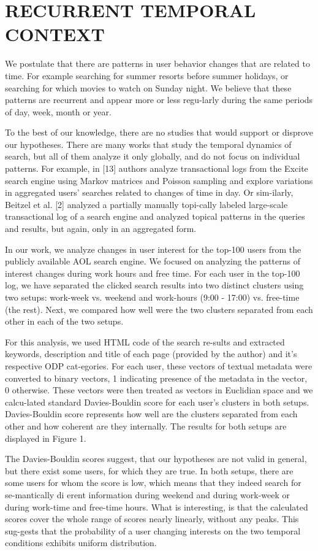 \documentclass{acm_proc_article-sp} %
\begin{document}
{\section{RECURRENT TEMPORAL CONTEXT}
We postulate that there are patterns in user behavior changes that are related to time. For example searching for summer resorts before summer holidays, or searching for which movies to watch on Sunday night. We believe that these patterns are recurrent and appear more or less regu-larly during the same periods of day, week, month or year.

To the best of our knowledge, there are no studies that would support or disprove our hypotheses. There are many works that study the temporal dynamics of search, but all of them analyze it only globally, and do not focus on individual patterns. For example, in [13] authors analyze transactional logs from the Excite search engine using Markov matrices and Poisson sampling and explore variations in aggregated users' searches related to changes of time in day. Or sim-ilarly, Beitzel et al. [2] analyzed a partially manually topi-cally labeled large-scale transactional log of a search engine and analyzed topical patterns in the queries and results, but again, only in an aggregated form.

In our work, we analyze changes in user interest for the top-100 users from the publicly available AOL search engine. We focused on analyzing the patterns of interest changes during work hours and free time. For each user in the top-100 log, we have separated the clicked search results into two distinct clusters using two setups: work-week vs. weekend and work-hours (9:00 - 17:00) vs. free-time (the rest). Next, we compared how well were the two clusters separated from each other in each of the two setups.

For this analysis, we used HTML code of the search re-sults and extracted keywords, description and title of each page (provided by the author) and it's respective ODP cat-egories. For each user, these vectors of textual metadata were converted to binary vectors, 1 indicating presence of the metadata in the vector, 0 otherwise. These vectors were then treated as vectors in Euclidian space and we calcu-lated standard Davies-Bouldin score for each user's clusters in both setups. Davies-Bouldin score represents how well are the clusters separated from each other and how coherent are they internally. The results for both setups are displayed in Figure 1.

The Davies-Bouldin scores suggest, that our hypotheses are not valid in general, but there exist some users, for which they are true. In both setups, there are some users for whom the score is low, which means that they indeed search for se-mantically di erent information during weekend and during work-week or during work-time and free-time hours. What is interesting, is that the calculated scores cover the whole range of scores nearly linearly, without any peaks. This sug-gests that the probability of a user changing interests on the two temporal conditions exhibits uniform distribution.

}
\end{document}
